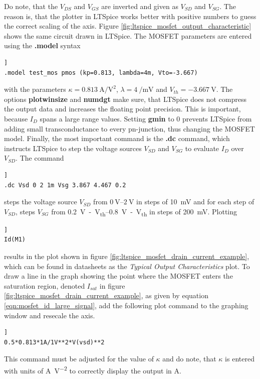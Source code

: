 \documentclass[12pt]{book}
\begin{document}
Do note, that the $V_{DS}$ and $V_{GS}$ are inverted and given as $V_{SD}$ and $V_{SG}$. The reason is, that the plotter in LTSpice works better with positive numbers to guess the correct scaling of the axis. Figure \ref{fig:ltspice_mosfet_output_characteristic} shows the same circuit drawn in LTSpice. The MOSFET parameters are entered using the \textbf{.model} syntax
\begin{lstlisting}[frame=single, xleftmargin=5mm, xrightmargin=5mm, columns=fullflexible, morekeywords={model, dc}, keywordstyle=\bfseries, basicstyle=\rmfamily]]
.model test_mos pmos (kp=0.813, lambda=4m, Vto=-3.667)
\end{lstlisting}
with the parameters $\kappa = \qty[per-mode=power]{0.813}{\ampere \per \square\volt}$, $\lambda = \qty[per-mode=power]{4}{\per \milli \volt}$ and $V_{th} = \qty{-3.667}{\V}$. The options \textbf{plotwinsize} and \textbf{numdgt} make sure, that LTSpice does not compress the output data and increases the floating point precision. This is important, because $I_D$ spans a large range values. Setting \textbf{gmin} to \num{0} prevents LTSpice from adding small transconductance to every pn-junction, thus changing the MOSFET model. Finally, the most important command is the \textbf{.dc} command, which instructs LTSpice to step the voltage sources $V_{SD}$ and $V_{SG}$ to evaluate $I_D$ over $V_{SD}$. The command
\begin{lstlisting}[frame=single, xleftmargin=5mm, xrightmargin=5mm, columns=fullflexible, morekeywords={model, dc}, keywordstyle=\bfseries, basicstyle=\rmfamily]]
.dc Vsd 0 2 1m Vsg 3.867 4.467 0.2
\end{lstlisting}
steps the voltage source $V_{SD}$ from $\qtyrange{0}{2}{\V}$ in steps of \qty{10}{\mV} and for each step of $V_{SD}$, steps $V_{SG}$ from \qtyrange{0.2}{0.8}{\V - V_{th}} in steps of \qty{200}{\mV}. Plotting
\begin{lstlisting}[frame=single, xleftmargin=5mm, xrightmargin=5mm, columns=fullflexible, morekeywords={model, dc}, keywordstyle=\bfseries, basicstyle=\rmfamily]]
Id(M1)
\end{lstlisting}
results in the plot shown in figure \ref{fig:ltspice_mosfet_drain_current_example}, which can be found in datasheets as the \textit{Typical Output Characteristics} plot.
To draw a line in the graph showing the point where the MOSFET enters the saturation region, denoted $I_{sat}$ in figure \ref{fig:ltspice_mosfet_drain_current_example}, as given by equation \ref{eqn:mosfet_id_large_signal}, add the following plot command to the graphing window and resecale the axis.
\begin{lstlisting}[frame=single, xleftmargin=5mm, xrightmargin=5mm, columns=fullflexible, morekeywords={model, dc}, keywordstyle=\bfseries, basicstyle=\rmfamily]]
0.5*0.813*1A/1V**2*V(vsd)**2
\end{lstlisting}
This command must be adjusted for the value of $\kappa$ and do note, that $\kappa$ is entered with units of \unit{\A \per \square\volt} to correctly display the output in \unit{\A}.
\end{document}
